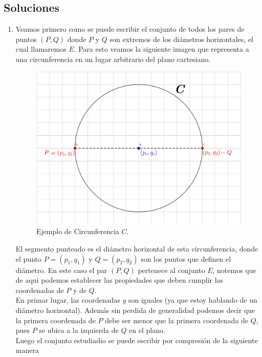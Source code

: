 \documentclass[letterpaper,12pt]{article}
\theoremstyle{plain}
\begin{document}
\begin{enumerate}[a)]
    \section{Soluciones}
    \begin{enumerate}[\bf P1.]
        \item Veamos primero como se puede escribir el conjunto de todos los pares de puntos $(P,Q)$ donde $P$ y $Q$ son extremos de los diámetros horizontales, el cual llamaremos $E$. Para esto veamos la siguiente imagen que representa a una circunferencia en un lugar arbitrario del plano cartesiano.
        \begin{figure}[H]
            \centering
            \includegraphics[scale=0.3]{img/p1.png}
            \caption{Ejemplo de Circunferencia \textbf{$C$}.}
            \label{fig:p1}
        \end{figure}
        El segmento punteado es el diámetro horizontal de esta circunferencia, donde el punto $P=(p_1,q_1)$ y $Q=(p_2,q_2)$ son los puntos que definen el diámetro. En este caso el par $(P,Q)$ pertenece al conjunto $E$, notemos que de aqui podemos establecer las propiedades que deben cumplir las coordenadas de $P$ y de $Q$.\\
        En primar lugar, las coordenadas $y$ son iguales (ya que estoy hablando de un diámetro horizontal). Además sin perdida de generalidad podemos decir que la primera coordenada de $P$ debe ser menor que la primera coordenada de $Q$, pues $P$ se ubica a la izquierda de $Q$ en el plano.\\
        Luego el conjunto estudiadio se puede escribir por compresión de la siguiente manera

\end{enumerate}
\end{enumerate}
\end{document}
